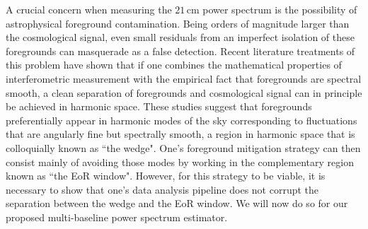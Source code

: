 \documentclass[twocolumn,apj,numberedappendix]{emulateapj}
\renewcommand\[{\begin{equation}}
\renewcommand\]{\end{equation}}
\begin{document}
A crucial concern when measuring the $21\,\textrm{cm}$ power spectrum is the possibility of astrophysical foreground contamination. Being orders of magnitude larger than the cosmological signal, even small residuals from an imperfect isolation of these foregrounds can masquerade as a false detection. Recent literature treatments of this problem have shown that if one combines the mathematical properties of interferometric measurement with the empirical fact that foregrounds are spectral smooth, a clean separation of foregrounds and cosmological signal can in principle be achieved in harmonic space. These studies suggest that foregrounds preferentially appear in harmonic modes of the sky corresponding to fluctuations that are angularly fine but spectrally smooth, a region in harmonic space that is colloquially known as ``the wedge". One's foreground mitigation strategy can then consist mainly of avoiding those modes by working in the complementary region known as ``the EoR window". However, for this strategy to be viable, it is necessary to show that one's data analysis pipeline does not corrupt the separation between the wedge and the EoR window. We will now do so for our proposed multi-baseline power spectrum estimator.

\end{document}
